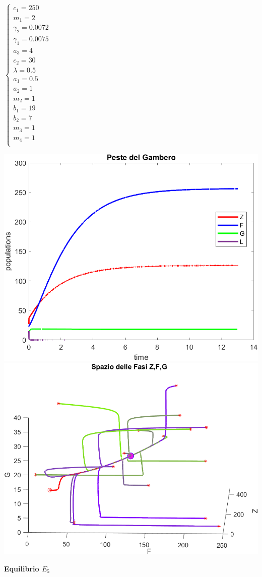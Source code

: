 \documentclass[12pt,a4paper]{article}
\numberwithin{theorem}{section}
\numberwithin{definition}{section}
\numberwithin{example}{section}
\newcommand{\deftitle}[1]{{\color{red}\bf{#1}\color{black}}}
\begin{document}
\begin{minipage}{0.2\textwidth}

$\begin{cases}
	c_1=250\\
	m_1=2\\
	\gamma_2=0.0072\\
	\gamma_1=0.0075\\
	a_3=4\\
	c_2=30\\
	\lambda=0.5\\ %
	a_1=0.5\\
	a_2=1\\
	m_2=1\\
	b_1=19\\
	b_2=7\\
	m_3=1\\
	m_4=1\\  
\end{cases}$ 
\end{minipage}
\begin{minipage}{0.7\textwidth}
    \centering
    \includegraphics[width=6 cm]{grafici/E4_fasi.png} 
    \\
    \includegraphics[width=6 cm]{grafici/E4_ritratto.png}
\end{minipage}

\newpage

\deftitle{Equilibrio $E_5$}
\end{document}
